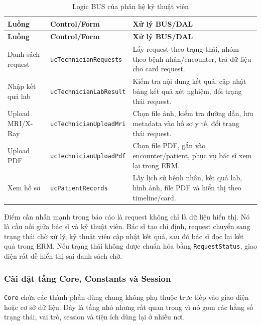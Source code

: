 \documentclass[12pt,a4paper]{article}
\numberwithin{figure}{subsection}
\numberwithin{table}{subsection}
\begin{document}
\begin{longtable}{|p{3.4cm}|p{4.8cm}|p{5.6cm}|}
\caption{Logic BUS của phân hệ kỹ thuật viên} \\
\hline
\textbf{Luồng} & \textbf{Control/Form} & \textbf{Xử lý BUS/DAL} \\
\hline
\endfirsthead
\hline
\textbf{Luồng} & \textbf{Control/Form} & \textbf{Xử lý BUS/DAL} \\
\hline
\endhead
Danh sách request & \texttt{ucTechnicianRequests} & Lấy request theo trạng thái, nhóm theo bệnh nhân/encounter, trả dữ liệu cho card request. \\
\hline
Nhập kết quả lab & \texttt{ucTechnicianLabResult} & Kiểm tra nội dung kết quả, cập nhật bảng kết quả xét nghiệm, đổi trạng thái request. \\
\hline
Upload MRI/X-Ray & \texttt{ucTechnicianUploadMri} & Chọn file ảnh, kiểm tra đường dẫn, lưu metadata vào hồ sơ y tế, đổi trạng thái request. \\
\hline
Upload PDF & \texttt{ucTechnicianUploadPdf} & Chọn file PDF, gắn vào encounter/patient, phục vụ bác sĩ xem lại trong ERM. \\
\hline
Xem hồ sơ & \texttt{ucPatientRecords} & Lấy lịch sử bệnh nhân, kết quả lab, hình ảnh, file PDF và hiển thị theo timeline/card. \\
\hline
\end{longtable}

Điểm cần nhấn mạnh trong báo cáo là request không chỉ là dữ liệu hiển thị. Nó là cầu nối giữa bác sĩ và kỹ thuật viên. Bác sĩ tạo chỉ định, request chuyển sang trạng thái chờ xử lý, kỹ thuật viên cập nhật kết quả, sau đó bác sĩ đọc lại kết quả trong ERM. Nếu trạng thái không được chuẩn hóa bằng \texttt{RequestStatus}, giao diện rất dễ hiển thị sai danh sách chờ.

\subsubsection{Cài đặt tầng Core, Constants và Session}

\texttt{Core} chứa các thành phần dùng chung không phụ thuộc trực tiếp vào giao diện hoặc cơ sở dữ liệu. Đây là tầng nhỏ nhưng rất quan trọng vì nó gom các hằng số trạng thái, vai trò, session và tiện ích dùng lại ở nhiều nơi.
\end{document}
